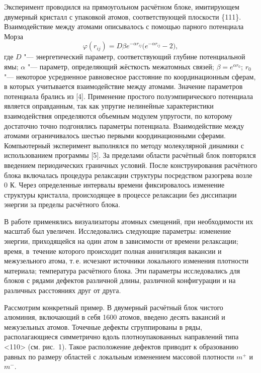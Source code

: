 Эксперимент проводился на прямоугольном расчётном блоке, имитирующем 
двумерный кристалл с упаковкой атомов, соответствующей плоскости 
\{111\}. 
Взаимодействие между атомами описывалось с помощью парного потенциала Морза
\begin{equation*}
\varphi (r_{ij} )=D\beta e^{-\alpha r_{ij} }\bigl(e^{-\alpha r_{ij} }-2\bigr),
\end{equation*}
где $D$ "--- энергетический параметр, соответствующий глубине потенциальной ямы; 
$\alpha $ "--- параметр, определяющий жёсткость межатомных связей; 
$\beta =e^{\alpha r_0 }$; $r_{0}$ "--- некоторое усредненное равновесное расстояние по координационным сферам, в которых учитывается взаимодействие между атомами. 
Значение параметров потенциала брались из [4]. Применение простого 
полуэмпирического потенциала является оправданным, так как упругие 
нелинейные характеристики взаимодействия определяются объемным модулем 
упругости, по которому достаточно точно подгонялись параметры потенциала. 
Взаимодействие между атомами ограничивалось шестью первыми координационными 
сферами. Компьютерный эксперимент выполнялся по методу молекулярной динамики 
с использованием программы [5]. За пределами области расчётный блок повторялся 
введением периодических граничных условий. После конструирования расчётного 
блока включалась процедура релаксации структуры посредством разогрева 
возле 0 К. Через определенные интервалы времени фиксировалось изменение 
структуры кристалла, происходящее в процессе релаксации без диссипации 
энергии за пределы расчётного блока. 

В работе применялись визуализаторы атомных смещений, при необходимости их 
масштаб был увеличен. Исследовались следующие параметры: изменение энергии, 
приходящейся на один атом в зависимости от времени релаксации; время, в~течение которого происходит полная аннигиляция вакансии и межузельного 
атома, т.\,е. исчезают источники локального изменения плотности материала; 
температура расчётного блока. Эти параметры исследовались для блоков с 
рядами дефектов различной длины, различной конфигурации и на различных 
расстояниях друг от друга.

Рассмотрим конкретный пример. В двумерный расчётный блок чистого алюминия, 
включающий в себя 1600 атомов, введено десять вакансий и межузельных атомов. 
Точечные дефекты сгруппированы в ряды, располагающиеся симметрично вдоль 
плотноупакованных направлений типа <110> (см. рис.~1). Такое 
расположение дефектов приводит к образованию равных по размеру областей с 
локальным изменением массовой плотности $m^{+}$ и $m^{-}$. 

